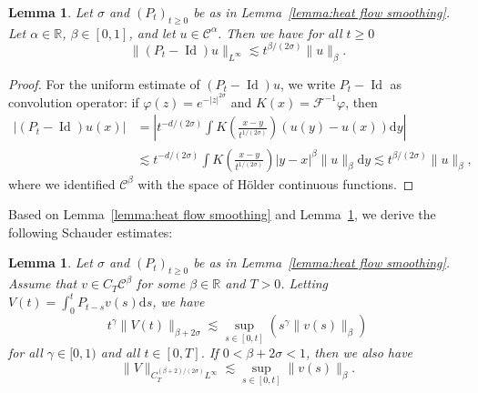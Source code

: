 \documentclass[11pt,a4paper]{article}
\newcommand{\mathd}{\mathrm{d}}
\newcommand{\tmop}[1]{\ensuremath{\operatorname{#1}}}
\newtheorem{lemma}[theorem]{Lemma}
\theoremstyle{remark}
\newtheorem{remark}[theorem]{Remark}
\newcommand{\CC}{\ensuremath{\mathscr{C}}}
\begin{document}


\begin{lemma}\label{lemma:semigroup hoelder in time}
   Let $\sigma$ and $(P_t)_{t \geqslant 0}$ be as in Lemma~\ref{lemma:heat flow smoothing}. Let $\alpha \in \mathbb{R}$, $\beta \in [ 0,1 ]$, and let $u \in \CC^{\alpha}$. Then we have for all $t \geqslant 0$
  \[
     \| ( P_{t} - \tmop{Id} ) u \|_{L^{\infty}} \lesssim t^{\beta / ( 2 \sigma )} \| u \|_{\beta}.
  \]
\end{lemma}

\begin{proof}
  For the uniform estimate of $( P_{t} - \tmop{Id} ) u$, we write $P_{t} - \tmop{Id}$ as convolution operator: if $\varphi ( z ) =e^{- | z |^{2\sigma}}$ and $K ( x ) =\mathcal{F}^{-1} \varphi$, then
  \begin{align*}
     | ( P_{t} - \tmop{Id} ) u ( x ) | & = \left| t^{-d/ ( 2 \sigma )} \int K \left( \frac{x-y}{t^{1/ ( 2 \sigma )}} \right) ( u ( y ) -u ( x ) ) \mathd y \right| \\
     & \lesssim t^{-d/ ( 2 \sigma )} \int K \left( \frac{x-y}{t^{1/ ( 2 \sigma )}} \right) | y-x |^{\beta} \| u \|_{\beta} \mathd y \lesssim t^{\beta / ( 2 \sigma )} \| u \|_{\beta},
  \end{align*}
  where we identified $\CC^{\beta}$ with the space of H{\"o}lder continuous functions.
\end{proof}

Based on Lemma~\ref{lemma:heat flow smoothing} and Lemma~\ref{lemma:semigroup hoelder in time}, we derive the following Schauder estimates:

\begin{lemma}\label{lemma:schauder}
  Let $\sigma$ and $(P_t)_{t \geqslant 0}$ be as in Lemma~\ref{lemma:heat flow smoothing}. Assume that $v \in C_{T} \CC^{\beta}$ for some $\beta \in \mathbb{R}$ and $T>0$. Letting $V ( t ) = \int_{0}^{t} P_{t-s} v ( s ) \mathd s$, we have
  \begin{equation}\label{eq:schauder-heat}
     t^{\gamma} \| V ( t ) \|_{\beta +2 \sigma} \lesssim \sup_{s \in [ 0,t ]} ( s^{\gamma} \| v ( s ) \|_{\beta} )
  \end{equation}
  for all $\gamma \in [ 0,1 )$ and all $t \in [ 0,T ]$. If $0< \beta +2 \sigma <1$, then we also have
  \begin{equation}\label{eq:holder-est-heat}
     \| V \|_{C_{T}^{( \beta +2 ) / ( 2 \sigma )} L^{\infty}} \lesssim \sup_{s \in [ 0,t ]} \| v ( s ) \|_{\beta} .
  \end{equation}
\end{lemma}
\end{document}
